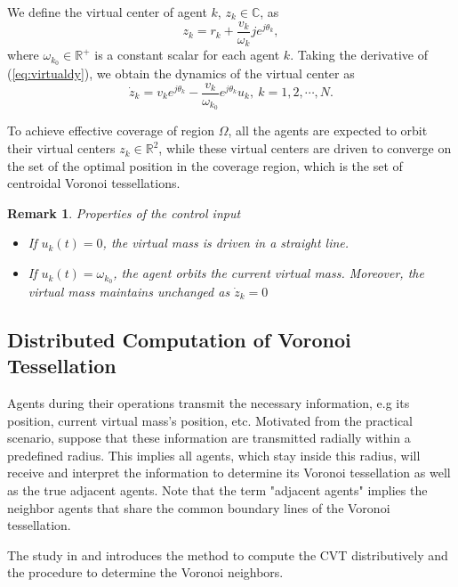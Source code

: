 \documentclass[journal]{IEEEtran}
\newtheorem{remark}{Remark}
\begin{document}
	We define the virtual center of agent $k$, $z_k \in \mathbb{C}$, as
	\begin{equation}\label{eqn:virtualdy}
	z_k = r_k + \frac{v_k}{\omega_k} j e^{j \theta_k},
	\end{equation}
	where $\omega_{k_0} \in \mathbb{R}^+$ is a constant scalar for each agent $k$. Taking the derivative of (\ref{eq:virtualdy}), we obtain the dynamics of the virtual center as
	\begin{equation} \label{eqn:z_kDot}
	\dot{z}_k = v_k e^{j \theta_k} - \frac{v_k}{\omega_{k_0}}e^{j \theta_k} u_k,~k = 1,2,\cdots,N.
	\end{equation}
	
	To achieve effective coverage of region $\Omega$, all the agents are expected to orbit their virtual centers $z_k \in \mathbb{R}^2$, while these virtual centers are driven to converge on the set of the optimal position in the coverage region, which is the set of centroidal Voronoi tessellations. \\
	
	{
		\color{red}
		\begin{remark}
			Properties of the control input
			
			\begin{itemize}
				\item If $u_k(t) = 0$, the virtual mass is driven in a straight line. 
				
				\item If $u_k(t) = \omega_{k_0} $, the agent orbits the current virtual mass. Moreover, the virtual mass maintains unchanged as $\dot{z}_k = 0 $
				
			\end{itemize}
		\end{remark}
		
		\subsection{Distributed Computation of Voronoi Tessellation}
		Agents during their operations transmit the necessary information, e.g its position, current virtual mass's position, etc. Motivated from the practical scenario, suppose that these information are transmitted radially within a predefined radius. This implies all agents, which stay inside this radius, will receive and interpret the information to determine its Voronoi tessellation as well as the true adjacent agents. Note that the term "adjacent agents" implies the neighbor agents that share the common boundary lines of the Voronoi tessellation.
		
		The study in \cite{DistributedGraph} and \cite{MDV} introduces the method to compute the CVT distributively and the procedure to determine the Voronoi neighbors.
	}
	
\end{document}
